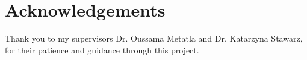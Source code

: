 
\section*{Acknowledgements}

Thank you to my supervisors Dr. Oussama Metatla and Dr. Katarzyna Stawarz,
for their patience and guidance through this project.
